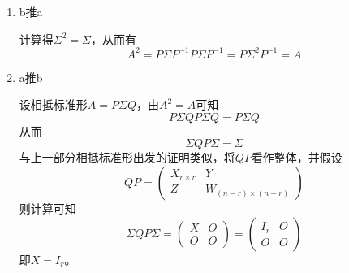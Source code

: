\documentclass[a4paper,UTF8,fontset=windows]{ctexart}
\begin{document}
\begin{enumerate}
    \item b推a
    
    计算得$\Sigma^2=\Sigma$，从而有
    $$A^2=P\Sigma P^{-1}P\Sigma P^{-1}=P\Sigma^2P^{-1}=A$$

    \item a推b
    
    设相抵标准形$A=P\Sigma Q$，由$A^2=A$可知
    $$P\Sigma QP\Sigma Q=P\Sigma Q$$
    从而
    $$\Sigma QP\Sigma=\Sigma$$
    与上一部分相抵标准形出发的证明类似，将$QP$看作整体，并假设
    $$QP=\begin{pmatrix}X_{r\times r}&Y\\Z&W_{(n-r)\times(n-r)}\end{pmatrix}$$
    则计算可知
    $$\Sigma QP\Sigma=\begin{pmatrix}X&O\\O&O\end{pmatrix}=\begin{pmatrix}I_r&O\\O&O\end{pmatrix}$$
    即$X=I_r$。


\end{enumerate}
\end{document}
